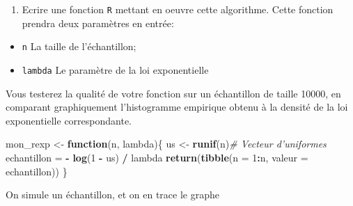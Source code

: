 \documentclass[]{article}
\newenvironment{Shaded}{\begin{snugshade}}{\end{snugshade}}
\newcommand{\CommentTok}[1]{\textcolor[rgb]{0.56,0.35,0.01}{\textit{#1}}}
\newcommand{\ControlFlowTok}[1]{\textcolor[rgb]{0.13,0.29,0.53}{\textbf{#1}}}
\newcommand{\DataTypeTok}[1]{\textcolor[rgb]{0.13,0.29,0.53}{#1}}
\newcommand{\DecValTok}[1]{\textcolor[rgb]{0.00,0.00,0.81}{#1}}
\newcommand{\KeywordTok}[1]{\textcolor[rgb]{0.13,0.29,0.53}{\textbf{#1}}}
\newcommand{\NormalTok}[1]{#1}
\newcommand{\OperatorTok}[1]{\textcolor[rgb]{0.81,0.36,0.00}{\textbf{#1}}}
\newcommand{\StringTok}[1]{\textcolor[rgb]{0.31,0.60,0.02}{#1}}
\providecommand{\tightlist}{%
  \setlength{\itemsep}{0pt}\setlength{\parskip}{0pt}}
\newenvironment{Correction}%
  { \vspace{\baselineskip}\begin{mdframed}[backgroundcolor=my_green]}%
  {\end{mdframed}}
\begin{document}
\begin{enumerate}
\def\labelenumi{\arabic{enumi}.}
\setcounter{enumi}{1}
\tightlist
\item
  Ecrire une fonction \texttt{R} mettant en oeuvre cette algorithme.
  Cette fonction prendra deux paramètres en entrée:
\end{enumerate}

\begin{itemize}
\tightlist
\item
  \texttt{n} La taille de l'échantillon;
\item
  \texttt{lambda} Le paramètre de la loi exponentielle
\end{itemize}

Vous testerez la qualité de votre fonction sur un échantillon de taille
10000, en comparant graphiquement l'histogramme empirique obtenu à la
densité de la loi exponentielle correspondante.

\begin{Shaded}
\begin{Highlighting}[]
\NormalTok{mon_rexp <-}\StringTok{ }\ControlFlowTok{function}\NormalTok{(n, lambda)\{}
\NormalTok{  us <-}\StringTok{ }\KeywordTok{runif}\NormalTok{(n)}\CommentTok{# Vecteur d'uniformes}
\NormalTok{  echantillon =}\StringTok{ }\OperatorTok{-}\StringTok{ }\KeywordTok{log}\NormalTok{(}\DecValTok{1} \OperatorTok{-}\StringTok{ }\NormalTok{us) }\OperatorTok{/}\StringTok{ }\NormalTok{lambda}
  \KeywordTok{return}\NormalTok{(}\KeywordTok{tibble}\NormalTok{(}\DataTypeTok{n =} \DecValTok{1}\OperatorTok{:}\NormalTok{n, }\DataTypeTok{valeur =}\NormalTok{ echantillon))}
\NormalTok{\}}
\end{Highlighting}
\end{Shaded}

\begin{Correction}

On simule un échantillon, et on en trace le graphe

\end{Correction}
\end{document}
